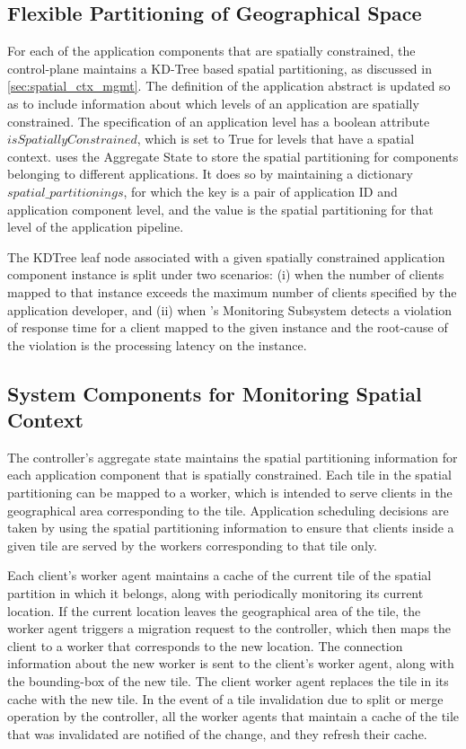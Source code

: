 \subsection{Flexible Partitioning of Geographical Space}
For each of the application components that are spatially constrained, the control-plane maintains a KD-Tree based spatial partitioning, as discussed in \cref{sec:spatial_ctx_mgmt}. The definition of the application abstract is updated so as to include information about which levels of an application are spatially constrained. The specification of an application level has a boolean attribute $isSpatiallyConstrained$, which is set to True for levels that have a spatial context. \oneedge{} uses the Aggregate State to store the spatial partitioning for components belonging to different applications. It does so by maintaining a dictionary $spatial\_partitionings$, for which the key is a pair of application ID and application component level, and the value is the spatial partitioning for that level of the application pipeline.
\par The KDTree leaf node associated with a given spatially constrained application component instance is split under two scenarios: (i) when the number of clients mapped to that instance exceeds the maximum number of clients specified by the application developer, and (ii) when \oneedge{}'s Monitoring Subsystem detects a violation of response time for a client mapped to the given instance and the root-cause of the violation is the processing latency on the instance.

\subsection{System Components for Monitoring Spatial Context}

The controller's aggregate state maintains the spatial partitioning information for each application component that is spatially constrained. Each tile in the spatial partitioning can be mapped to a worker, which is intended to serve clients in the geographical area corresponding to the tile. Application scheduling decisions are taken by using the spatial partitioning information to ensure that clients inside a given tile are served by the workers corresponding to that tile only. 
\par Each client's worker agent maintains a cache of the current tile of the spatial partition in which it belongs, along with periodically monitoring its current location. If the current location leaves the geographical area of the tile, the worker agent triggers a migration request to the controller, which then maps the client to a worker that corresponds to the new location. The connection information about the new worker is sent to the client's worker agent, along with the bounding-box of the new tile. The client worker agent replaces the tile in its cache with the new tile. In the event of a tile invalidation due to split or merge operation by the controller, all the worker agents that maintain a cache of the tile that was invalidated are notified of the change, and they refresh their cache.

